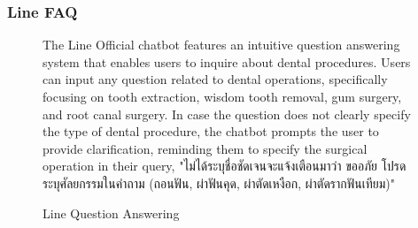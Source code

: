 \documentclass[12pt,oneside,openright,a4paper]{cpe-english-project}
\begin{document}
          \subsubsection{Line FAQ}
            \begin{figure}[H]
              \centering
              \caption{Line Question Answering}\label{fig:lineFAQ}
              \begin{justify}
                \qquad The Line Official chatbot features an intuitive question answering system that enables users to inquire about dental procedures. Users can input any question related to dental operations, specifically focusing on tooth extraction, wisdom tooth removal, gum surgery, and root canal surgery. In case the question does not clearly specify the type of dental procedure, the chatbot prompts the user to provide clarification, reminding them to specify the surgical operation in their query, "\textthai{ไม่ได้ระบุชื่อชัดเจนจะแจ้งเตือนมาว่า ขออภัย โปรดระบุศัลยกรรมในคำถาม (ถอนฟัน, ผ่าฟันคุด, ผ่าตัดเหงือก, ผ่าตัดรากฟันเทียม)}"\par
              \end{justify}
            \end{figure}
\end{document}
